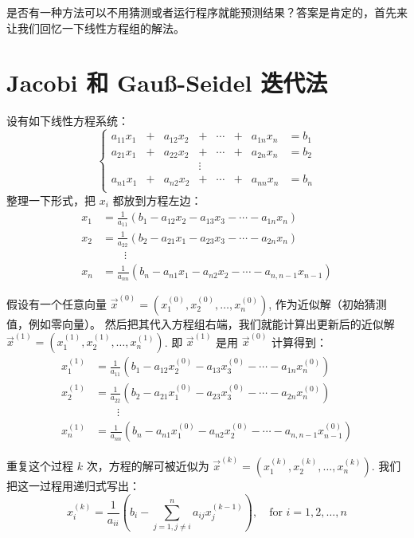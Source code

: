 \documentclass[notitlepage,oneside]{book}
\begin{document}
是否有一种方法可以不用猜测或者运行程序就能预测结果？答案是肯定的，首先来让我们回忆一下线性方程组的解法。

\section{Jacobi 和 Gauß-Seidel 迭代法}
\label{sec:gauss-seidel}
设有如下线性方程系统：
$$
\left\{
\begin{array}{cccccccc}
a_{11}x_1 & + &  a_{12}x_2  &+      & \cdots & + & a_{1n}x_n &= b_1\\
a_{21}x_1 & + &  a_{22}x_2  &+      & \cdots & + & a_{2n}x_n &= b_2\\
          &   &             &\vdots &        &   &           &     \\
a_{n1}x_1 & + &  a_{n2}x_2  &+      & \cdots & + & a_{nn}x_n &= b_n\\
\end{array}
\right.
$$
整理一下形式，把 $x_i$ 都放到方程左边：
\begin{align*}
x_1 &= \frac{1}{a_{11}}(b_1 - a_{12}x_2 - a_{13}x_3 - \cdots - a_{1n}x_n)\\
x_2 &= \frac{1}{a_{22}}(b_2 - a_{21}x_1 - a_{23}x_3 - \cdots - a_{2n}x_n)\\
    & \qquad \vdots \\
x_n &= \frac{1}{a_{nn}}(b_n - a_{n1}x_1 - a_{n2}x_2 - \cdots - a_{n,n-1}x_{n-1})
\end{align*}

假设有一个任意向量 $\vec{x}^{(0)}=\left(x_1^{(0)}, x_2^{(0)}, \dots, x_n^{(0)}\right)$, 作为近似解（初始猜测值，例如零向量）。
然后把其代入方程组右端，我们就能计算出更新后的近似解 $\vec{x}^{(1)}=\left(x_1^{(1)}, x_2^{(1)}, \dots, x_n^{(1)}\right)$.
即 $\vec{x}^{(1)}$ 是用 $\vec{x}^{(0)}$ 计算得到： 
\begin{align*}
x_1^{(1)} &= \frac{1}{a_{11}}(b_1 - a_{12}x_2^{(0)} - a_{13}x_3^{(0)} - \cdots - a_{1n}x_n^{(0)})\\
x_2^{(1)} &= \frac{1}{a_{22}}(b_2 - a_{21}x_1^{(0)} - a_{23}x_3^{(0)} - \cdots - a_{2n}x_n^{(0)})\\
    & \qquad \vdots \\
x_n^{(1)} &= \frac{1}{a_{nn}}(b_n - a_{n1}x_1^{(0)} - a_{n2}x_2^{(0)} - \cdots - a_{n,n-1}x_{n-1}^{(0)})
\end{align*}

重复这个过程 $k$ 次，方程的解可被近似为 $\vec{x}^{(k)}=\left(x_1^{(k)}, x_2^{(k)}, \dots, x_n^{(k)}\right)$.
我们把这一过程用递归式写出：
$$
x_i^{(k)} = \frac{1}{a_{ii}} \left(b_i - \sum\limits_{j=1,j\neq i}^n a_{ij}x_j^{(k-1)} \right), \quad \text{for } i=1,2,\dots,n
$$
\end{document}
